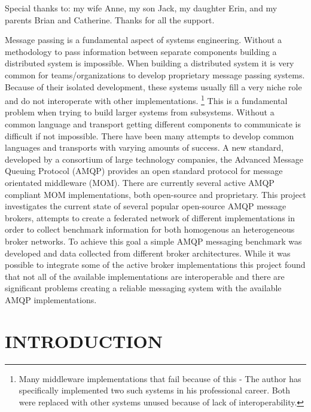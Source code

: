 \documentclass{thesis}
\author{David Joe Wade}
\begin{document}
 
\listoftodos
\titlepage            	 %
\tableofcontents          %
\listoftables          	 %
\listoffigures         	 %

Special thanks to: my wife Anne, my son Jack, my daughter Erin, and my parents Brian and Catherine.  Thanks for all the support.  

Message passing is a fundamental aspect of systems engineering.  Without a methodology to pass information between separate components building a distributed system is impossible.  When building a distributed system it is very common for teams/organizations to develop proprietary message passing systems.  Because of their isolated development, these systems usually fill a very niche role and do not interoperate with other implementations. \footnote{Many middleware implementations that fail because of this - The author has specifically implemented two such systems in his professional career.  Both were replaced with other systems unused because of lack of interoperability.} This is a fundamental problem when trying to build larger systems from subsystems.  Without a common language and transport getting different components to communicate is difficult if not impossible.  There have been many attempts to develop common languages and transports with varying amounts of success.  A new standard, developed by a consortium of large technology companies, the Advanced Message Queuing Protocol (AMQP) provides an open standard protocol for message orientated middleware (MOM).  There are currently several active AMQP compliant MOM implementations, both open-source and proprietary.  This project investigates the current state of several popular open-source AMQP message brokers, attempts to create a federated network of different implementations in order to collect benchmark information for both homogenous an heterogeneous broker networks.  To achieve this goal a simple AMQP messaging benchmark was developed and data collected from different broker architectures.  While it was possible to integrate some of the active broker implementations this project found that not all of the available implementations are interoperable and there are significant problems creating a reliable messaging system with the available AMQP implementations.  


\chapter{INTRODUCTION}
\end{document}

